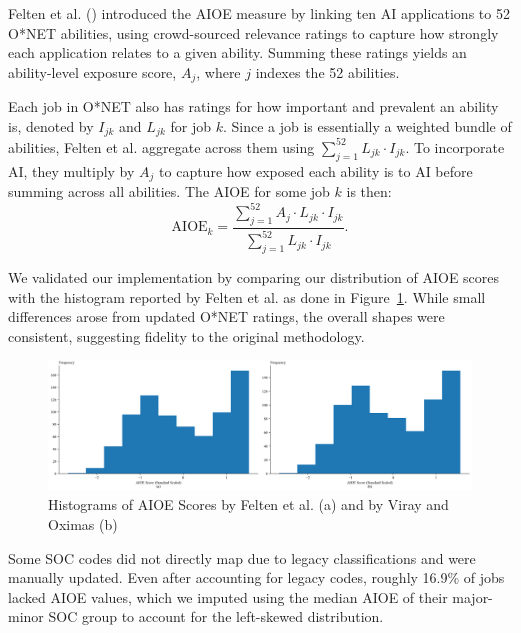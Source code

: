 
Felten et al. (\citeyear{felten2021}) introduced the AIOE measure by linking ten AI applications to 52 O*NET abilities, 
using crowd-sourced relevance ratings to capture how strongly each application relates to a given ability. 
Summing these ratings yields an ability-level exposure score, $A_j$, where $j$ indexes the 52 abilities. 

Each job in O*NET also has ratings for how important and prevalent an ability is, denoted by $I_{jk}$ and $L_{jk}$ for job $k$. 
Since a job is essentially a weighted bundle of abilities, Felten et al. aggregate across them using 
$\sum_{j=1}^{52} L_{jk} \cdot I_{jk}$. 
To incorporate AI, they multiply by $A_j$ to capture how exposed each ability is to AI before summing across all abilities. 
The AIOE for some job $k$ is then: 
$$ \text{AIOE}_k = \frac{\sum_{j=1}^{52} A_j \cdot L_{jk} \cdot I_{jk}}{\sum_{j=1}^{52} L_{jk} \cdot I_{jk}}. $$ 

We validated our implementation by comparing our distribution of AIOE scores with the histogram reported by Felten et al. as done in Figure~\ref{fig:histograms}. 
While small differences arose from updated O*NET ratings, the overall shapes were consistent, suggesting fidelity to the original methodology. 

\begin{figure}[ht] 
    \centering 
    \includegraphics[width=\linewidth]{../figures/histograms_aioe.png} 
    \caption{Histograms of AIOE Scores by Felten et al. (a) and by Viray and Oximas (b)} 
    \label{fig:histograms} 
\end{figure} 

Some SOC codes did not directly map due to legacy classifications and were manually updated. 
Even after accounting for legacy codes, roughly 16.9\% of jobs lacked AIOE values, 
which we imputed using the median AIOE of their major-minor SOC group to account for the left-skewed distribution.